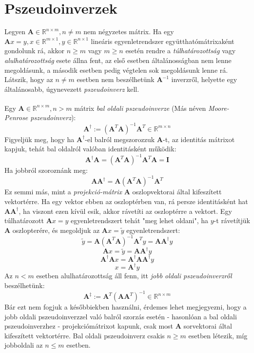 \documentclass[14p]{report}
\def\pmb{\boldsymbol}
\begin{document}
	\section{Pszeudoinverzek}
	Legyen $\pmb{A} \in \mathbb{R}^{n\times m}, n \ne m$ nem négyzetes mátrix. Ha egy  $\pmb{A}x = y , x \in \mathbb{R}^{m\times 1}, y \in \mathbb{R}^{n \times 1}$ lineáris egyenletrendszer együtthatómátrixaként gondolunk rá, akkor $n \ge m$ vagy $m \ge n$ esetén rendre a \emph{túlhatározottság} vagy \emph{alulhatározottság} esete állna fent, az első esetben általánosságban nem lenne megoldásunk, a második esetben pedig végtelen sok megoldásunk lenne rá. Látszik, hogy az $n \ne m$ esetben nem beszélhetünk $\pmb{A}^{-1}$ inverzről, helyette egy általánosabb, úgynevezett \emph{pszeudoinverz} kell.
	\\
	\\
	Egy $\pmb{A} \in \mathbb{R}^{n \times m}, n > m$ mátrix \emph{bal oldali pszeudoinverze} (Más néven \emph{Moore-Penrose pszeudoinverz}):
	\[
	\pmb{A}^{\dagger} := (\pmb{A}^T\pmb{A})^{-1}\pmb{A}^T \in \mathbb{R}^{m \times n}
	\]
	Figyeljük meg, hogy ha $\pmb{A}^{\dagger}$-el balról megszorozzuk $\pmb{A}$-t, az identitás mátrixot kapjuk, tehát bal oldalról valóban identitásként működik:
	\[
	\pmb{A}^{\dagger}\pmb{A} = (\pmb{A}^T\pmb{A})^{-1}\pmb{A}^T\pmb{A} = \pmb{I}
	\]
	Ha jobbról szoroznánk meg:
	\[
	\pmb{A}\pmb{A}^{\dagger} = \pmb{A}(\pmb{A}^T\pmb{A})^{-1}\pmb{A}^T
	\]
	Ez semmi más, mint a \emph{projekció-mátrix} $\pmb{A}$ oszlopvektorai által kifeszített vektortérre. Ha egy vektor ebben az oszloptérben van, rá persze identitásként hat $\pmb{A}\pmb{A}^{\dagger}$, ha viszont ezen kívül esik, akkor rávetíti az oszloptérre a vektort. Egy túlhatározott $\pmb{A}x = y$ egyenletrendszert tehát "meg lehet oldani", ha $y$-t rávetítjük $\pmb{A}$ oszlopterére, és megoldjuk az $\pmb{A}x = \tilde{y}$ egyenletrendszert: 
	\[
	\tilde{y} = \pmb{A}(\pmb{A}^T\pmb{A})^{-1}\pmb{A}^T y = \pmb{A}\pmb{A}^{\dagger} y
	\]
	\[
	\pmb{A}x = \tilde{y} = \pmb{A}\pmb{A}^{\dagger}y
	\]
	\[
	\pmb{A}^{\dagger}\pmb{A}x = \pmb{A}^{\dagger}\pmb{A}\pmb{A}^{\dagger}y
	\]
	\[
	x  = \pmb{A}^{\dagger}y
	\]
	Az $n < m$ esetben alulhatározottság áll fenn, itt \emph{jobb oldali pszeudoinverzről} beszélhetünk:
	\[
	\pmb{A}^{\ddagger} := \pmb{A}^T(\pmb{A}\pmb{A}^T)^{-1} \in \mathbb{R}^{n \times m}
	\]
	Bár ezt nem fogjuk a későbbiekben használni, érdemes lehet megjegyezni, hogy a jobb oldali pszeudoinverzzel való balról szorzás esetén - hasonlóan a bal oldali pszeudoinverzhez - projekciómátrixot kapunk, csak most $\pmb{A}$ sorvektorai által kifeszített vektortérre. Bal oldali pszeudoinverz csakis $n \ge m$ esetben létezik, míg jobboldali az $n \le m$ esetben.
	
\end{document}
